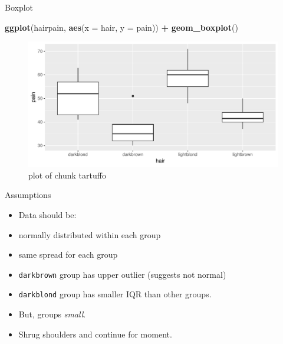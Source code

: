 \documentclass[ignorenonframetext,]{beamer}
\newenvironment{Shaded}{\begin{snugshade}}{\end{snugshade}}
\newcommand{\DataTypeTok}[1]{\textcolor[rgb]{0.13,0.29,0.53}{#1}}
\newcommand{\KeywordTok}[1]{\textcolor[rgb]{0.13,0.29,0.53}{\textbf{#1}}}
\newcommand{\NormalTok}[1]{#1}
\newcommand{\OperatorTok}[1]{\textcolor[rgb]{0.81,0.36,0.00}{\textbf{#1}}}
\newcommand{\StringTok}[1]{\textcolor[rgb]{0.31,0.60,0.02}{#1}}
\begin{document}
\begin{frame}[fragile]{Boxplot}
\protect\hypertarget{boxplot}{}

\begin{Shaded}
\begin{Highlighting}[]
\KeywordTok{ggplot}\NormalTok{(hairpain, }\KeywordTok{aes}\NormalTok{(}\DataTypeTok{x =}\NormalTok{ hair, }\DataTypeTok{y =}\NormalTok{ pain)) }\OperatorTok{+}\StringTok{ }\KeywordTok{geom_boxplot}\NormalTok{()}
\end{Highlighting}
\end{Shaded}

\begin{figure}
\centering
\includegraphics{figure/tartuffo-1.pdf}
\caption{plot of chunk tartuffo}
\end{figure}

\end{frame}

\begin{frame}[fragile]{Assumptions}
\protect\hypertarget{assumptions}{}

\begin{itemize}
\item
  Data should be:
\item
  normally distributed within each group
\item
  same spread for each group
\item
  \texttt{darkbrown} group has upper outlier (suggests not normal)
\item
  \texttt{darkblond} group has smaller IQR than other groups.
\item
  But, groups \emph{small}.
\item
  Shrug shoulders and continue for moment.
\end{itemize}

\end{frame}
\end{document}

